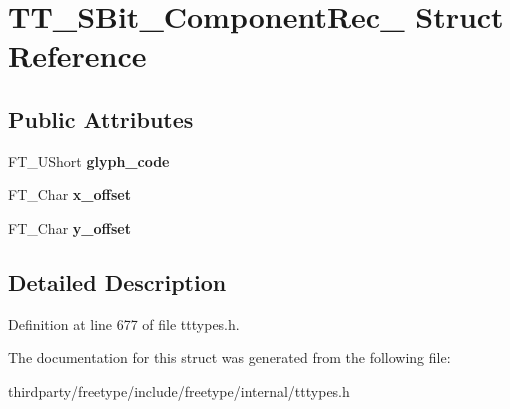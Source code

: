 \hypertarget{struct_t_t___s_bit___component_rec__}{}\section{T\+T\+\_\+\+S\+Bit\+\_\+\+Component\+Rec\+\_\+ Struct Reference}
\label{struct_t_t___s_bit___component_rec__}
\subsection*{Public Attributes}
\begin{DoxyCompactItemize}
\item 
\mbox{\label{struct_t_t___s_bit___component_rec___a357eef9c05c65034b506cdd48271e562}} 
F\+T\+\_\+\+U\+Short {\bfseries glyph\+\_\+code}
\item 
\mbox{\label{struct_t_t___s_bit___component_rec___a97799704aa59bf737e274289fa70ca3f}} 
F\+T\+\_\+\+Char {\bfseries x\+\_\+offset}
\item 
\mbox{\label{struct_t_t___s_bit___component_rec___af24f91b7d5e0268a223514ad68a9a10b}} 
F\+T\+\_\+\+Char {\bfseries y\+\_\+offset}
\end{DoxyCompactItemize}


\subsection{Detailed Description}


Definition at line 677 of file tttypes.\+h.



The documentation for this struct was generated from the following file\+:\begin{DoxyCompactItemize}
\item 
thirdparty/freetype/include/freetype/internal/tttypes.\+h\end{DoxyCompactItemize}
